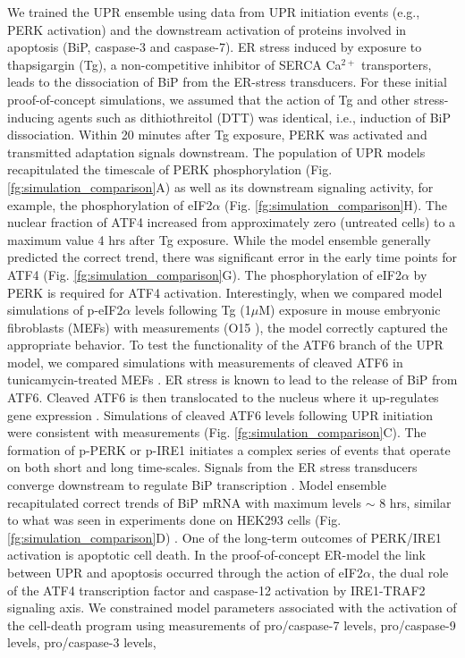 \documentclass[fleqn,10pt]{wlscirep}
\begin{document}
We trained the UPR ensemble using data from UPR initiation events (e.g., PERK activation) and the downstream activation of proteins involved in apoptosis (BiP, caspase-3 and caspase-7). ER stress induced by exposure to thapsigargin (Tg), a non-competitive inhibitor of SERCA Ca$^{2+}$ transporters, leads to the dissociation of BiP from the ER-stress transducers. For these initial proof-of-concept simulations, we assumed that the action of Tg and other stress-inducing agents such as dithiothreitol (DTT) was identical, i.e., induction of BiP dissociation. Within 20 minutes after Tg exposure, PERK was activated and transmitted adaptation signals downstream. The population of UPR models recapitulated the timescale of PERK phosphorylation (Fig. \ref{fg:simulation_comparison}A) as well as its downstream signaling activity, for example, the phosphorylation of eIF2$\alpha$ (Fig. \ref{fg:simulation_comparison}H). The nuclear fraction of ATF4 increased from approximately zero (untreated cells) to a maximum value 4 hrs after Tg exposure. While the model ensemble generally predicted the correct trend, there was significant error in the early time points for ATF4 (Fig. \ref{fg:simulation_comparison}G). The phosphorylation of eIF2$\alpha$ by PERK is required for ATF4 activation. Interestingly, when we compared model simulations of p-eIF2$\alpha$ levels following Tg (1$\mu$M) exposure in mouse embryonic fibroblasts (MEFs) with measurements (O15 \cite{yamamoto2007tim}), the model correctly captured the appropriate behavior. To test the functionality of the ATF6 branch of the UPR model, we compared simulations with measurements of cleaved ATF6 in tunicamycin-treated MEFs \cite{lee2002imu}. ER stress is known to lead to the release of BiP from ATF6. Cleaved ATF6 is then translocated to the nucleus where it up-regulates gene expression \cite{silver1999mtf,hai1989tfa}. Simulations of cleaved ATF6 levels following UPR initiation were consistent with measurements (Fig. \ref{fg:simulation_comparison}C). The formation of p-PERK or p-IRE1 initiates a complex series of events that operate on both short and long time-scales. Signals from the ER stress transducers converge downstream to regulate BiP transcription \cite{malhotra2007era, rao2004mpe,kokame2001iei, yoshida2000aap}. Model ensemble recapitulated correct trends of BiP mRNA with maximum levels $\sim$ 8 hrs, similar to what was seen in experiments done on HEK293 cells (Fig. \ref{fg:simulation_comparison}D) \cite{lin2007ire1}. One of the long-term outcomes of PERK/IRE1 activation is apoptotic cell death. In the proof-of-concept ER-model the link between UPR and apoptosis occurred through the action of eIF2$\alpha$, the dual role of the ATF4 transcription factor and caspase-12 activation by IRE1-TRAF2 signaling axis. We constrained model parameters associated with the activation of the cell-death program using measurements of pro/caspase-7 levels, pro/caspase-9 levels, pro/caspase-3 levels, 
\end{document}
